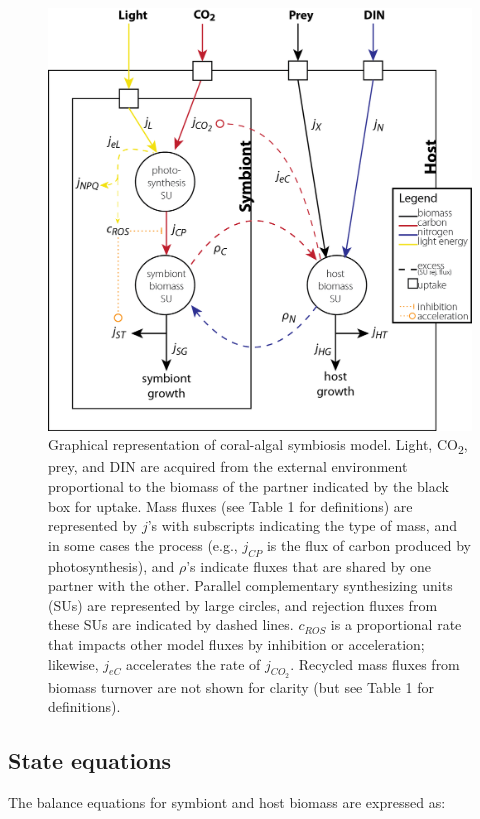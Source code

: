 \documentclass[]{elsarticle} %
\makeatletter
\def\maxwidth{\ifdim\Gin@nat@width>\linewidth\linewidth
\else\Gin@nat@width\fi}
\let\Oldincludegraphics\includegraphics
\renewcommand{\includegraphics}[1]{\Oldincludegraphics[width=\maxwidth]{#1}}
\makeatother
\begin{document}
\begin{figure}[htbp]
\centering
\includegraphics{../img/Fig1.png}
\caption{Graphical representation of coral-algal symbiosis model. Light,
CO\textsubscript{2}, prey, and DIN are acquired from the external
environment proportional to the biomass of the partner indicated by the
black box for uptake. Mass fluxes (see Table 1 for definitions) are
represented by \(j\)'s with subscripts indicating the type of mass, and
in some cases the process (e.g., \(j_{CP}\) is the flux of carbon
produced by photosynthesis), and \(\rho\)'s indicate fluxes that are
shared by one partner with the other. Parallel complementary
synthesizing units (SUs) are represented by large circles, and rejection
fluxes from these SUs are indicated by dashed lines. \(c_{ROS}\) is a
proportional rate that impacts other model fluxes by inhibition or
acceleration; likewise, \(j_{eC}\) accelerates the rate of \(j_{CO_2}\).
Recycled mass fluxes from biomass turnover are not shown for clarity
(but see Table 1 for definitions).}
\end{figure}

\subsection{State equations}\label{state-equations}

The balance equations for symbiont and host biomass are expressed as:
\end{document}
